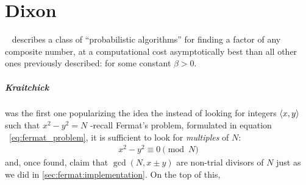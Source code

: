 \chapter{Dixon \label{chap:dixon}}

~\cite{dixon} describes a class of ``probabilistic algorithms'' for finding a
factor of any composite number, at a computational cost asymptotically  best
than all other ones previously described:
for some constant $\beta > 0$.

\paragraph{Kraitchick} was the first one popularizing the idea the instead of
looking for integers $\langle x, y\rangle$ such that $x^2 -y^2 = N$ -recall Fermat's
problem, formulated in equation ~\ref{eq:fermat_problem}, it is sufficient to
look for \emph{multiples} of $N$:
\begin{align}
  x^2 - y^2 \equiv 0 \pmod{N}
\end{align}
and, once found, claim that $\gcd(N, x \pm y)$ are non-trial divisors of $N$
just as we did in \ref{sec:fermat:implementation}.
On the top of this,

